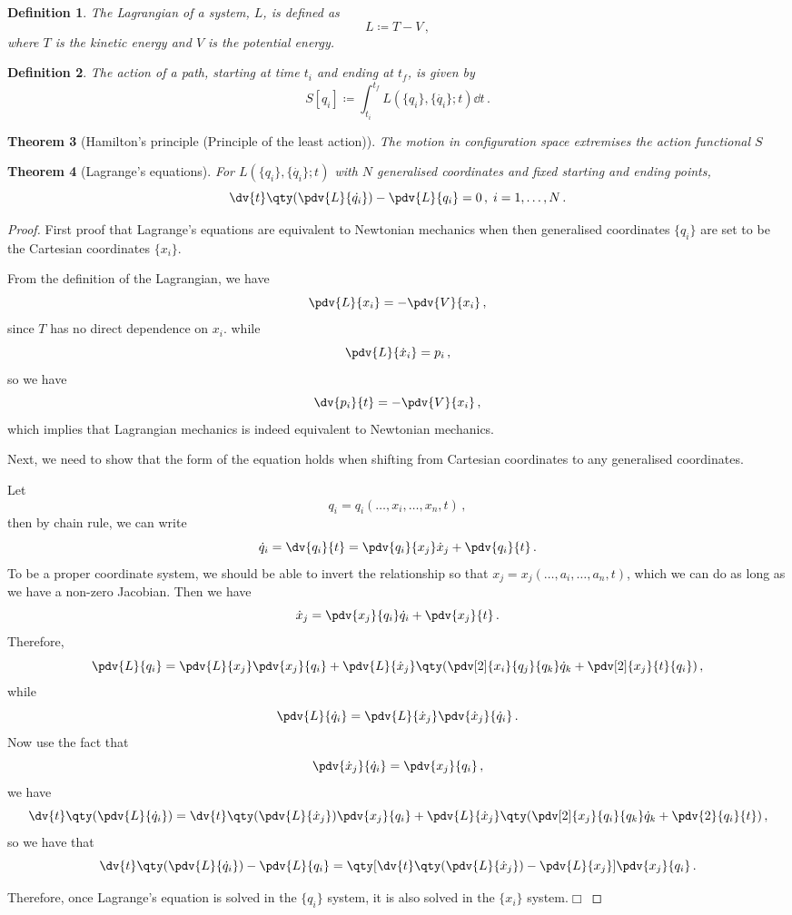 \documentclass{article}
\theoremstyle{plain}\theoremheaderfont{\normalfont\itshape}\theorembodyfont{\rmfamily}\theoremseparator{.}\newtheorem*{rem}{Remark}\newtheorem*{ex}{Example}\newtheorem*{proof}{Proof}\newtheorem*{altp}{Alternative proof}
\theoremstyle{plain}\theoremheaderfont{\normalfont\bfseries}\theorembodyfont{\rmfamily}\theoremseparator{.}\newtheorem{thm}{Theorem}[section]\newtheorem{lem}[thm]{Lemma}\newtheorem{prop}[thm]{Proposition}\newtheorem*{cor}{Corollary}\newtheorem{defn}[thm]{Definition}\newtheorem{clm}[thm]{Claim}\newtheorem{clminproof}{Claim}
\theoremstyle{break}\theoremheaderfont{\normalfont\itshape}\theorembodyfont{\rmfamily}\theoremseparator{.\medskip}\newtheorem*{proofskip}{Proof}\newtheorem*{exs}{Examples}\newtheorem*{rems}{Remarks}
\theoremstyle{break}\theoremheaderfont{\normalfont\bfseries}\theorembodyfont{\rmfamily}\theoremseparator{.\medskip}\newtheorem{lemskip}[thm]{Lemma}\newtheorem{defnskip}[thm]{Definition}\newtheorem{propskip}[thm]{Proposition}\newtheorem{thmskip}[thm]{Theorem}
\numberwithin{equation}{section}
\newcommand{\qed}{\hfill\ensuremath{\Box}}
\begin{document}
	\begin{defn}
		The \textit{Lagrangian} of a system, \(L\), is defined as
		\[L\coloneqq T-V\,,\]
		where \(T\) is the kinetic energy and \(V\) is the potential energy.
	\end{defn}
	\begin{defn}
		The \textit{action} of a path, starting at time \(t_i\) and ending at \(t_f\), is given by
		\[S[{q_i}]\coloneqq\int_{t_i}^{t_f}L(\{q_i\},\{\dot{q_i}\};t)\dd{t}\,.\]
	\end{defn}
	\begin{thm}[Hamilton's principle (Principle of the least action)]	
		The motion in configuration space extremises the action functional \(S\)
	\end{thm}
	\begin{thm}[Lagrange's equations]\label{lageq}
		For \(L(\{q_i\},\{\dot{q_i}\};t)\) with \(N\) generalised coordinates and fixed starting and ending points,
		\[\dv{t}\qty(\pdv{L}{\dot{q_i}})-\pdv{L}{q_i}=0\,,\;i=1,\dots,N\,.\]
	\end{thm}
	\begin{proof}
		First proof that Lagrange's equations are equivalent to Newtonian mechanics when then generalised coordinates \(\{q_i\}\) are set to be the Cartesian coordinates \(\{x_i\}\).

		From the definition of the Lagrangian, we have
		\[\pdv{L}{x_i}=-\pdv{V}{x_i}\,,\]
		since \(T\) has no direct dependence on \(x_i\). while
		\[\pdv{L}{\dot{x}_i}=p_i\,,\]
		so we have
		\[\dv{p_i}{t}=-\pdv{V}{x_i}\,,\]
		which implies that Lagrangian mechanics is indeed equivalent to Newtonian mechanics.

		Next, we need to show that the form of the equation holds when shifting from Cartesian coordinates to any generalised coordinates.

		Let
		\[q_i=q_i(\dots,x_i,\dots,x_n,t)\,,\]
		then by chain rule, we can write
		\[\dot{q}_i=\dv{q_i}{t}=\pdv{q_i}{x_j}\dot{x}_j+\pdv{q_i}{t}\,.\]
		To be a proper coordinate system, we should be able to invert the relationship so that \(x_j=x_j(\dots,a_i,\dots,a_n,t)\), which we can do as long as we have a non-zero Jacobian. Then we have
		\[\dot{x}_j=\pdv{x_j}{q_i}\dot{q}_i+\pdv{x_j}{t}\,.\]
		Therefore,
		\[\pdv{L}{q_i}=\pdv{L}{x_j}\pdv{x_j}{q_i}+\pdv{L}{\dot{x}_j}\qty(\pdv[2]{x_i}{q_j}{q_k}\dot{q}_k+\pdv[2]{x_j}{t}{q_i})\,,\]
		while
		\[\pdv{L}{\dot{q}_i}=\pdv{L}{\dot{x}_j}\pdv{\dot{x}_j}{\dot{q}_i}\,.\]
		Now use the fact that
		\[\pdv{\dot{x}_j}{\dot{q}_i}=\pdv{x_j}{q_i}\,,\]
		we have
		\[\dv{t}\qty(\pdv{L}{\dot{q}_i})=\dv{t}\qty(\pdv{L}{\dot{x}_j})\pdv{x_j}{q_i}+\pdv{L}{\dot{x}_j}\qty(\pdv[2]{x_j}{q_i}{q_k}\dot{q}_k+\pdv{2}{q_i}{t})\,,\]
		so we have that
		\[\dv{t}\qty(\pdv{L}{\dot{q}_i})-\pdv{L}{q_i}=\qty[\dv{t}\qty(\pdv{L}{\dot{x}_j})-\pdv{L}{x_j}]\pdv{x_j}{q_i}\,.\]

		Therefore, once Lagrange's equation is solved in the \(\{q_i\}\) system, it is also solved in the \(\{x_i\}\) system.\qed
	\end{proof}
\end{document}
